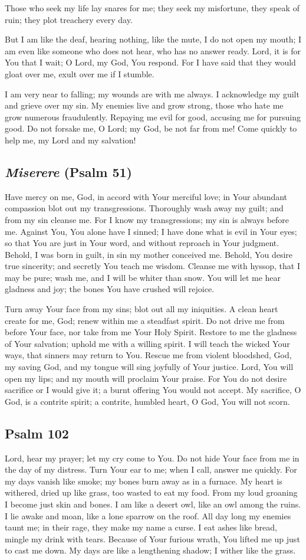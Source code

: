 \documentclass[12pt]{article}
\newcommand{\prayertitle}[1]{\subsection{#1}}
\newcommand{\indulgencedprayertitle}[1]{\prayertitle{#1 \protect\kreuz}}
\newcommand{\foreign}[1]{\textsl{#1}}
\begin{document}
Those who seek my life lay snares for me;
they seek my misfortune, they speak of ruin;
they plot treachery every day.

But I am like the deaf, hearing nothing, like the mute, I do not open my mouth;
I am even like someone who does not hear, who has no answer ready.
Lord, it is for You that I wait;
O Lord, my God, You respond.
For I have said that they would gloat over me, exult over me if I stumble.

I am very near to falling;
my wounds are with me always.
I acknowledge my guilt
and grieve over my sin.
My enemies live and grow strong, those who hate me grow numerous fraudulently.
Repaying me evil for good,
accusing me for pursuing good.
Do not forsake me, O Lord;
my God, be not far from me!
Come quickly to help me, my Lord and my salvation!

\indulgencedprayertitle{\foreign{Miserere} (Psalm 51)}
Have mercy on me, God, in accord with Your merciful love;
in Your abundant compassion blot out my transgressions.
Thoroughly wash away my guilt;
and from my sin cleanse me.
For I know my transgressions;
my sin is always before me.
Against You, You alone have I sinned;
I have done what is evil in Your eyes;
so that You are just in Your word, and without reproach in Your judgment.
Behold, I was born in guilt, in sin my mother conceived me.
Behold, You desire true sincerity;
and secretly You teach me wisdom.
Cleanse me with hyssop, that I may be pure;
wash me, and I will be whiter than snow.
You will let me hear gladness and joy;
the bones You have crushed will rejoice.

Turn away Your face from my sins;
blot out all my iniquities.
A clean heart create for me, God;
renew within me a steadfast spirit.
Do not drive me from before Your face, nor take from me Your Holy Spirit.
Restore to me the gladness of Your salvation;
uphold me with a willing spirit.
I will teach the wicked Your ways, that sinners may return to You.
Rescue me from violent bloodshed, God, my saving God, and my tongue will sing joyfully of Your justice.
Lord, You will open my lips;
and my mouth will proclaim Your praise.
For You do not desire sacrifice or I would give it;
a burnt offering You would not accept.
My sacrifice, O God, is a contrite spirit;
a contrite, humbled heart, O God, You will not scorn.

\indulgencedprayertitle{Psalm 102}
Lord, hear my prayer;
let my cry come to You.
Do not hide Your face from me in the day of my distress.
Turn Your ear to me;
when I call, answer me quickly.
For my days vanish like smoke;
my bones burn away as in a furnace.
My heart is withered, dried up like grass, too wasted to eat my food.
From my loud groaning I become just skin and bones.
I am like a desert owl, like an owl among the ruins.
I lie awake and moan, like a lone sparrow on the roof.
All day long my enemies taunt me;
in their rage, they make my name a curse.
I eat ashes like bread, mingle my drink with tears.
Because of Your furious wrath, You lifted me up just to cast me down.
My days are like a lengthening shadow;
I wither like the grass.
\end{document}
